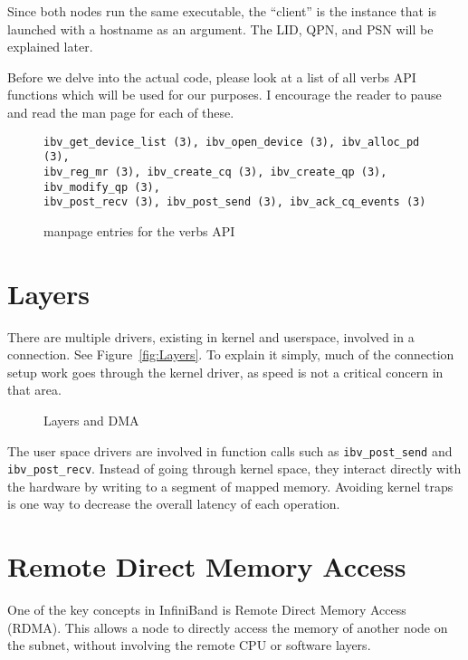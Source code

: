 \documentclass[letterpaper,12pt]{article}
\begin{document}
Since both nodes run the same executable, the ``client'' is the instance
that is launched with a hostname as an argument. The LID, QPN, and PSN
will be explained later.

Before we delve into the actual code, please look at a list of all
verbs API functions which will be used for our purposes.  I encourage
the reader to pause and read the man page for each of these.
\begin{figure}
\caption{manpage entries for the verbs API}
\begin{verbatim}
ibv_get_device_list (3), ibv_open_device (3), ibv_alloc_pd (3),
ibv_reg_mr (3), ibv_create_cq (3), ibv_create_qp (3), ibv_modify_qp (3),
ibv_post_recv (3), ibv_post_send (3), ibv_ack_cq_events (3)
\end{verbatim}
\end{figure}

\section{Layers}

There are multiple drivers, existing in kernel and
userspace, involved in a connection. See Figure~\ref{fig:Layers}. To explain it simply,
much of the connection setup work goes through the kernel driver, as
speed is not a critical concern in that area.

\begin{figure}
\centering
\caption{Layers and DMA}
\end{figure}

The user space drivers are involved in function calls such as
{\tt ibv\_post\_send} and {\tt ibv\_post\_recv}. Instead of going through kernel
space, they interact directly with the hardware by writing to a segment of
mapped memory. Avoiding kernel traps is one way to decrease the overall
latency of each operation.

\section{Remote Direct Memory Access}

One of the key concepts in
InfiniBand is Remote Direct Memory Access (RDMA). This allows a node
to directly access the memory of another node on the subnet, without
involving the remote CPU or software layers.
\end{document}
